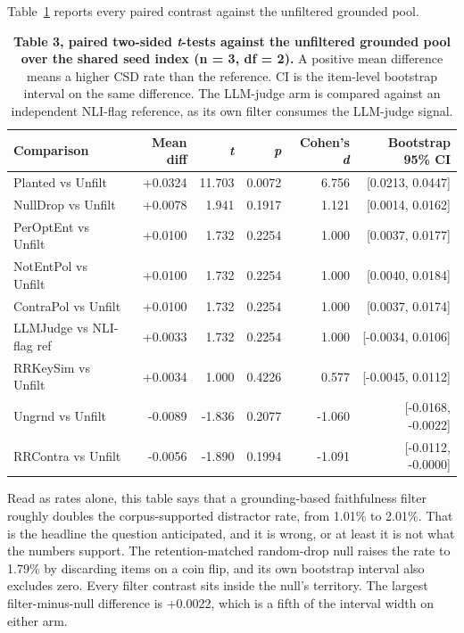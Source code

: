 \documentclass[11pt]{article}
\begin{document}
Table~\ref{tab:3} reports every paired contrast against the unfiltered grounded pool.

\begin{table}[t]
\centering
\small
\begin{tabular}{lrrrrr}
\toprule
\textbf{Comparison} & \textbf{Mean diff} & \textbf{\emph{t}} & \textbf{\emph{p}} & \textbf{Cohen's \emph{d}} & \textbf{Bootstrap 95\% CI} \\
\midrule
Planted vs Unfilt & +0.0324 & 11.703 & 0.0072 & 6.756 & [0.0213, 0.0447] \\
NullDrop vs Unfilt & +0.0078 & 1.941 & 0.1917 & 1.121 & [0.0014, 0.0162] \\
PerOptEnt vs Unfilt & +0.0100 & 1.732 & 0.2254 & 1.000 & [0.0037, 0.0177] \\
NotEntPol vs Unfilt & +0.0100 & 1.732 & 0.2254 & 1.000 & [0.0040, 0.0184] \\
ContraPol vs Unfilt & +0.0100 & 1.732 & 0.2254 & 1.000 & [0.0037, 0.0174] \\
LLMJudge vs NLI-flag ref & +0.0033 & 1.732 & 0.2254 & 1.000 & [-0.0034, 0.0106] \\
RRKeySim vs Unfilt & +0.0034 & 1.000 & 0.4226 & 0.577 & [-0.0045, 0.0112] \\
Ungrnd vs Unfilt & -0.0089 & -1.836 & 0.2077 & -1.060 & [-0.0168, -0.0022] \\
RRContra vs Unfilt & -0.0056 & -1.890 & 0.1994 & -1.091 & [-0.0112, -0.0000] \\
\bottomrule
\end{tabular}
\caption{\textbf{Table 3, paired two-sided \emph{t}-tests against the unfiltered grounded pool over the shared seed index (n = 3, df = 2).} A positive mean difference means a higher CSD rate than the reference. CI is the item-level bootstrap interval on the same difference. The LLM-judge arm is compared against an independent NLI-flag reference, as its own filter consumes the LLM-judge signal.}
\label{tab:3}
\end{table}

Read as rates alone, this table says that a grounding-based faithfulness filter roughly doubles the corpus-supported distractor rate, from 1.01\% to 2.01\%. That is the headline the question anticipated, and it is wrong, or at least it is not what the numbers support. The retention-matched random-drop null raises the rate to 1.79\% by discarding items on a coin flip, and its own bootstrap interval also excludes zero. Every filter contrast sits inside the null's territory. The largest filter-minus-null difference is +0.0022, which is a fifth of the interval width on either arm.
\end{document}
